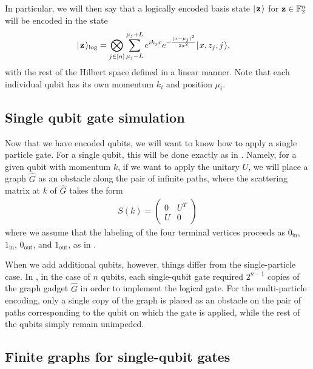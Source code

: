 \documentclass[../thesis-main/thesis-main]{subfiles}
\begin{document}
In particular, we will then say that a logically encoded basis state $|\mspace{2mu} \mathbf{z} \mspace{2mu} \rangle$ for $\mathbf{z}\in \mathbb{F}_2^n$ will be encoded in the state
\begin{align}
  |\mspace{2mu} \mathbf{z} \mspace{2mu} \rangle_{\text{log}} &= \bigotimes_{j\in [n]} \sum_{\mu_j-L}^{\mu_j+L} e^{i k_j x} e^{- \frac{(x - \mu_j)^2}{2\sigma^2}} |\mspace{2mu} x,z_j,j \mspace{2mu} \rangle,
\end{align}
with the rest of the Hilbert space defined in a linear manner.  Note that each individual qubit has its own momentum $k_i$ and position $\mu_i$.  



\subsection{Single qubit gate simulation}

Now that we have encoded qubits, we will want to know how to apply a single particle gate.  For a single qubit, this will be done exactly as in .  Namely, for a given qubit with momentum $k$, if we want to apply the unitary $U$, we will place a graph $\widehat{G}$ as an obstacle along the pair of infinite paths, where the scattering matrix at $k$ of $\widehat{G}$ takes the form
\begin{align}
  S(k) = \begin{pmatrix}
    0& U^T\\
    U & 0
  \end{pmatrix}
\end{align}
where we assume that the labeling of the four terminal vertices proceeds as $0_{\text{in}}$, $1_{\text{in}}$, $0_{\text{out}}$, and $1_{\text{out}}$, as in . 

When we add additional qubits, however, things differ from the single-particle case.  In , in the case of $n$ qubits, each single-qubit gate required $2^{n-1}$ copies of the graph gadget $\widehat{G}$ in order to implement the logical gate.  For the multi-particle encoding, only a single copy of the graph is placed as an obstacle on the pair of paths corresponding to the qubit on which the gate is applied, while the rest of the qubits simply remain unimpeded.  

\subsection{Finite graphs for single-qubit gates}

\end{document}
